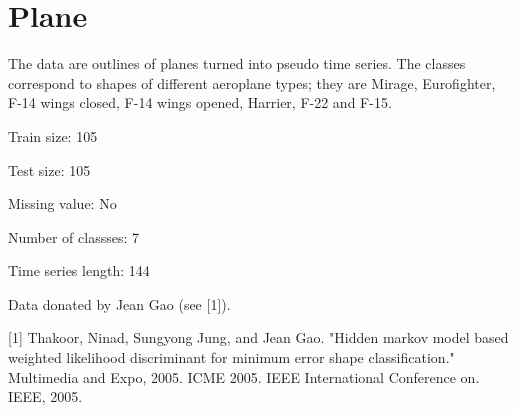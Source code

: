 \chapter{Plane}
\hypertarget{md_external_2data_2UCRArchive__2018_2Plane_2README}{}\label{md_external_2data_2UCRArchive__2018_2Plane_2README}
\label{md_external_2data_2UCRArchive__2018_2Plane_2README_autotoc_md182}%
%
 The data are outlines of planes turned into pseudo time series. The classes correspond to shapes of different aeroplane types; they are Mirage, Eurofighter, F-\/14 wings closed, F-\/14 wings opened, Harrier, F-\/22 and F-\/15.

Train size\+: 105

Test size\+: 105

Missing value\+: No

Number of classses\+: 7

Time series length\+: 144

Data donated by Jean Gao (see \mbox{[}1\mbox{]}).

\mbox{[}1\mbox{]} Thakoor, Ninad, Sungyong Jung, and Jean Gao. "{}\+Hidden markov model based weighted likelihood discriminant for minimum error shape classification."{} Multimedia and Expo, 2005. ICME 2005. IEEE International Conference on. IEEE, 2005. 